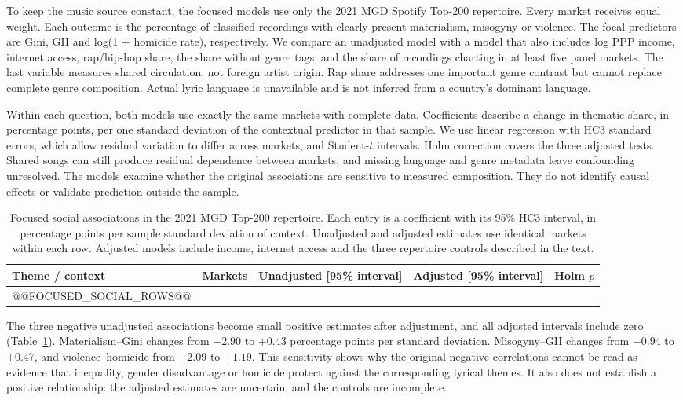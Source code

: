 To keep the music source constant, the focused models use only the 2021 MGD Spotify Top-200 repertoire. Every market receives equal weight. Each outcome is the percentage of classified recordings with clearly present materialism, misogyny or violence. The focal predictors are Gini, GII and log(1 + homicide rate), respectively. We compare an unadjusted model with a model that also includes log PPP income, internet access, rap/hip-hop share, the share without genre tags, and the share of recordings charting in at least five panel markets. The last variable measures shared circulation, not foreign artist origin. Rap share addresses one important genre contrast but cannot replace complete genre composition. Actual lyric language is unavailable and is not inferred from a country's dominant language.

Within each question, both models use exactly the same markets with complete data. Coefficients describe a change in thematic share, in percentage points, per one standard deviation of the contextual predictor in that sample. We use linear regression with HC3 standard errors, which allow residual variation to differ across markets, and Student-$t$ intervals. Holm correction covers the three adjusted tests. Shared songs can still produce residual dependence between markets, and missing language and genre metadata leave confounding unresolved. The models examine whether the original associations are sensitive to measured composition. They do not identify causal effects or validate prediction outside the sample.

\begin{table}[t]
\caption{Focused social associations in the 2021 MGD Top-200 repertoire. Each entry is a coefficient with its 95\% HC3 interval, in percentage points per sample standard deviation of context. Unadjusted and adjusted estimates use identical markets within each row. Adjusted models include income, internet access and the three repertoire controls described in the text.}
\label{tab:context}
\centering\small
\begin{tabularx}{\textwidth}{@{}Xrlll@{}}
\toprule Theme / context & Markets & Unadjusted [95\% interval] & Adjusted [95\% interval] & Holm $p$ \\
\midrule
@@FOCUSED_SOCIAL_ROWS@@
\bottomrule
\end{tabularx}
\end{table}

The three negative unadjusted associations become small positive estimates after adjustment, and all adjusted intervals include zero (Table~\ref{tab:context}). Materialism--Gini changes from $-2.90$ to $+0.43$ percentage points per standard deviation. Misogyny--GII changes from $-0.94$ to $+0.47$, and violence--homicide from $-2.09$ to $+1.19$. This sensitivity shows why the original negative correlations cannot be read as evidence that inequality, gender disadvantage or homicide protect against the corresponding lyrical themes. It also does not establish a positive relationship: the adjusted estimates are uncertain, and the controls are incomplete.

